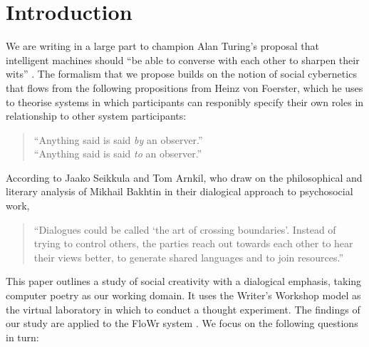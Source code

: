\section{Introduction}
\label{sec:intro}


We are writing in a large part to champion Alan Turing's
proposal that intelligent machines should ``be able to converse with
each other to sharpen their wits'' \cite{turing-intelligent}. 
%
The formalism that we propose builds on the notion of social cybernetics that flows
from the following propositions from Heinz von Foerster, which he uses to theorise systems
in which participants can responibly specify their own roles in relationship to
other system participants:

\begin{quote}
``Anything said is said \emph{by} an observer.'' \\
``Anything said is said \emph{to} an observer.''\\
\end{quote}

According to Jaako Seikkula and Tom Arnkil, who draw on the philosophical and literary analysis of Mikhail Bakhtin \cite{bakhtin2010toward,bakhtin1984problems} in their dialogical approach to psychosocial work,
\begin{quote}
``Dialogues could be called `the art of crossing boundaries'.  Instead of trying to control others, the parties reach out towards each other to hear their views better, to generate shared languages and to join resources.''
\end{quote}

This paper outlines a study of social creativity with a dialogical emphasis, taking computer
poetry as our working domain.  It uses the Writer's Workshop model
\cite{gabriel2002writer} as the virtual laboratory in which to conduct a thought experiment.
The findings of our study are applied to the FloWr system \cite{charnley2014flowr}. 
We focus on the following questions in turn:



